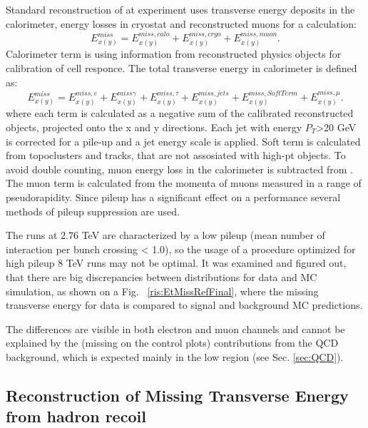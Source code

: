 Standard reconstruction of \etmiss at \atlas experiment uses transverse energy deposits in the calorimeter, energy losses in cryostat and reconstructed muons for a calculation:
\begin{equation}
E_{x(y)}^{miss} = E_{x(y)}^{miss, calo} +  E_{x(y)}^{miss, cryo} +  E_{x(y)}^{miss, muon}.
\end{equation}
Calorimeter term is using information from reconstructed physics objects for calibration of cell responce. The total transverse energy in calorimeter is defined as:
\begin{equation}
E_{x(y)}^{miss} = E_{x(y)}^{miss, e} + E_{x(y)}^{miss \gamma} + E_{x(y)}^{miss, \tau} + E_{x(y)}^{miss, jets} + E_{x(y)}^{miss,SoftTerm} + E_{x(y)}^{miss, \mu}.
\end{equation}
where each term is calculated as a negative sum of the calibrated reconstructed objects, projected onto the x and y directions. Each jet with energy $P_T$>20 GeV is corrected for a pile-up and a jet energy scale is applied. Soft term is calculated from topoclusters and tracks, that are not assosiated with high-pt objects. To avoid double counting, muon energy loss  in the calorimeter is  subtracted from \etmiss.  The \etmiss muon term is calculated from the momenta of muons measured in a range of pseudorapidity. Since pileup has a significant effect on a \etmiss performance several methods of pileup suppression are used.

The runs at 2.76 TeV are characterized by a low pileup (mean number of interaction per bunch crossing < 1.0), so the usage of a procedure optimized for high pileup 8 TeV runs may not be optimal. It was examined and figured out, that there are big discrepancies between \etmiss distributions for data and MC simulation, as shown on a Fig. ~\ref{ris:EtMissRefFinal}, where the missing transverse energy for data is compared to signal and background MC predictions. 

The differences are visible in both electron and muon channels and cannot be explained by the (missing on the control plots) contributions from the QCD background, which is expected mainly in the low \etmiss region (see Sec. \ref{sec:QCD}). 



\subsection{Reconstruction of Missing Transverse Energy from hadron recoil}



